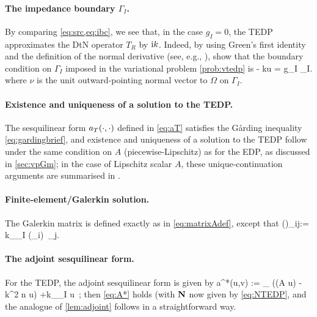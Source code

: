 \paragraph{The impedance boundary $\Gamma_I$.} By comparing \cref{eq:src,eq:ibc}, we see that, in the case $g_I=0$, the TEDP approximates the DtN operator $T_R$ by $\mathrm{i} k$. Indeed, by using Green's first identity and the definition of the normal derivative (see, e.g., \cite[Lemma 4.3]{Mc:00}), show that the boundary condition on $\Gamma_I$ imposed in the variational problem \cref{prob:vtedp} is 
\beq\label{eq:imp}
\dudnu - \ri k\gamma u = g_I \ton \Gamma_I.
\eeq
where $\nu$ is the unit outward-pointing normal vector to $\Omega$ on $\Gamma_I$.

\paragraph{Existence and uniqueness of a solution to the TEDP.} The sesquilinear form $a_{T}(\cdot,\cdot)$ defined in \cref{eq:aT} satisfies the G\aa rding inequality \cref{eq:gardingbrief}, and existence and uniqueness of a solution to the TEDP follow under the same condition on $A$ (piecewise-Lipschitz) as for the EDP, as discussed in \cref{sec:vpGm}; in the case of Lipschitz scalar $A$, these unique-continuation arguments are summarised in \cite[\S2]{GrSa:18}.

\paragraph{Finite-element/Galerkin solution.}
The Galerkin matrix is defined exactly as in \cref{eq:matrixAdef}, except that 
\beq\label{eq:NTEDP}
\big(\Nmat\big)_{ij}:= \ri k\int_{\Gamma_I}  (\gamma\phi_i) \,\gamma \phi_j.
\eeq

\paragraph{The adjoint sesquilinear form.} For the TEDP, the adjoint sesquilinear form is given by 
\beq\label{eq:TEDPadjoint}
a^*(u,v) := \int_{\DR} 
\Big((A \grad u)\cdot\grad \vb
 - k^2 n u\vb\Big) +\ri k\int_{\Gamma_I} \gamma u\, ;
\eeq
then \cref{eq:A*} holds (with $\mathbf{N}$ now given by \cref{eq:NTEDP}, and the analogue of \cref{lem:adjoint} follows in a straightforward way.



